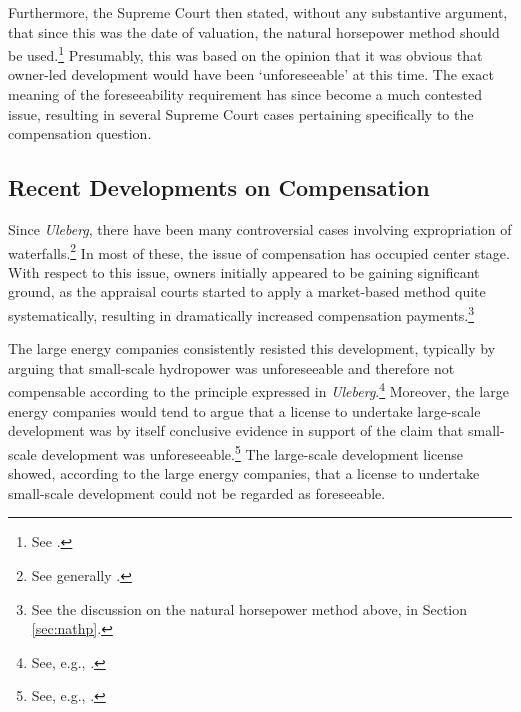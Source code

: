 Furthermore, the Supreme Court then stated, without any substantive argument, that since this was the date of valuation, the natural horsepower method should be used.\footnote{See \cite[62]{uleberg08}.} Presumably, this was based on the opinion that it was obvious that owner-led development would have been `unforeseeable' at this time. The exact meaning of the foreseeability requirement has since become a much contested issue, resulting in several Supreme Court cases pertaining specifically to the compensation question.

\subsection{Recent Developments on Compensation}

Since {\it Uleberg}, there have been many controversial cases involving expropriation of waterfalls.\footnote{See generally \cite{larsen06,larsen08,larsen12}.} In most of these, the issue of compensation has occupied center stage. %
With respect to this issue, owners initially appeared to be gaining significant ground, as the appraisal courts started to apply a market-based method quite systematically, resulting in dramatically increased compensation payments.\footnote{See the discussion on the natural horsepower method above, in Section \ref{sec:nathp}.}

The large energy companies consistently resisted this development, typically by arguing that small-scale hydropower was unforeseeable and therefore not compensable according to the principle expressed in {\it Uleberg}.\footnote{See, e.g., \cite{klovtveit11,otra10,otra13}.} Moreover, the large energy companies would tend to argue that a license to undertake large-scale development was by itself conclusive evidence in support of the claim that small-scale development was unforeseeable.\footnote{See, e.g., \cite[17]{otra10}.} The large-scale development license showed, according to the large energy companies, that a license to undertake small-scale development could not be regarded as foreseeable.

